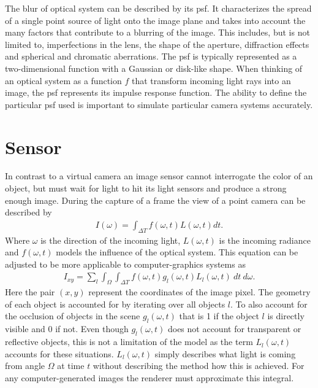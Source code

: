The blur of optical system can be described by its \gls{psf}.
It characterizes the spread of a single point source of light onto the image plane and takes into account the many factors that contribute to a blurring of the image.
This includes, but is not limited to, imperfections in the lens, the shape of the aperture, diffraction effects and spherical and chromatic aberrations.
The \gls{psf} is typically represented as a two-dimensional function with a Gaussian or disk-like shape.
When thinking of an optical system as a function $f$ that transform incoming light rays into an image, the \gls{psf} represents its impulse response function.\cite{Beyerer.2016}
The ability to define the particular \gls{psf} used is important to simulate particular camera systems accurately.

\section{Sensor}
In contrast to a virtual camera an image sensor cannot interrogate the color of an object, but must wait for light to hit its light sensors and produce a strong enough image.
During the capture of a frame the view of a point camera can be described by
\begin{align}
    I(\omega) = \int_{\Delta T} f(\omega,t) L(\omega,t)dt.
    \label{eq:mb-integral}
\end{align}
Where $\omega$ is the direction of the incoming light, $L(\omega,t)$ is the incoming radiance and $f(\omega,t)$ models the influence of the optical system.
This equation can be adjusted to be more applicable to computer-graphics systems as
\begin{align}
    I_{xy} = \sum_l \int_\Omega \int_{\Delta T} f(\omega, t) g_l(\omega, t) L_l(\omega, t) \: dt \: d\omega.
    \label{eq:mb-cg-integral}
\end{align}
Here the pair $(x,y)$ represent the coordinates of the image pixel.
The geometry of each object is accounted for by iterating over all objects $l$.
To also account for the occlusion of objects in the scene $g_l(\omega, t)$ that is 1 if the object $l$ is directly visible and 0 if not.
Even though $g_l(\omega, t)$ does not account for transparent or reflective objects, this is not a limitation of the model as the term $L_l(\omega, t)$ accounts for these situations.
$L_l(\omega, t)$ simply describes what light is coming from angle $\Omega$ at time $t$ without describing the method how this is achieved. \cite{Navarro.2011}
For any computer-generated images the renderer must approximate this integral.

